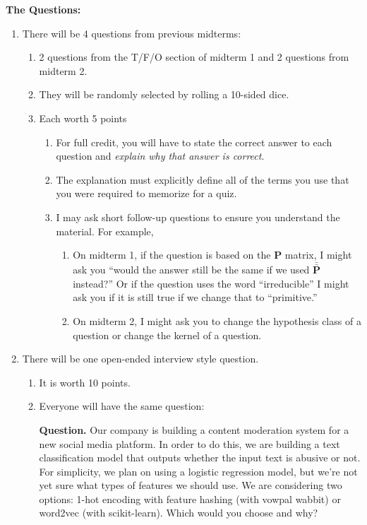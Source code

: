\documentclass[10pt]{exam}
\theoremstyle{definition}
\newcommand{\p}{\mathbf P}
\newcommand{\pb}{\bar {\p}}
\newcommand{\pbb}{\bar {\pb}}
\begin{document}
\noindent
\textbf{The Questions:}
\begin{enumerate}
\item There will be 4 questions from previous midterms:
\begin{enumerate}
\item 2 questions from the T/F/O section of midterm 1 and 2 questions from midterm 2.
\item They will be randomly selected by rolling a 10-sided dice.

\item Each worth 5 points
\begin{enumerate}
\item For full credit, you will have to state the correct answer to each question and \emph{explain why that answer is correct}.
\item The explanation must explicitly define all of the terms you use that you were required to memorize for a quiz.
\item I may ask short follow-up questions to ensure you understand the material.
    For example,
    \begin{enumerate}
        \item On midterm 1, if the question is based on the $\p$ matrix, I might ask you ``would the answer still be the same if we used $\pbb$ instead?''  Or if the question uses the word ``irreducible'' I might ask you if it is still true if we change that to ``primitive.''
        \item On midterm 2, I might ask you to change the hypothesis class of a question or change the kernel of a question.
    \end{enumerate}
\end{enumerate}
\end{enumerate}
\item There will be one open-ended interview style question.
    \begin{enumerate}
        \item It is worth 10 points.
        \item Everyone will have the same question:

\noindent
\textbf{Question.}
Our company is building a content moderation system for a new social media platform.
In order to do this, we are building a text classification model that outputs whether the input text is abusive or not.
For simplicity, we plan on using a logistic regression model,
but we're not yet sure what types of features we should use.
We are considering two options: 1-hot encoding with feature hashing (with vowpal wabbit) or word2vec (with scikit-learn).
Which would you choose and why?


\end{enumerate}
\end{enumerate}
\end{document}
